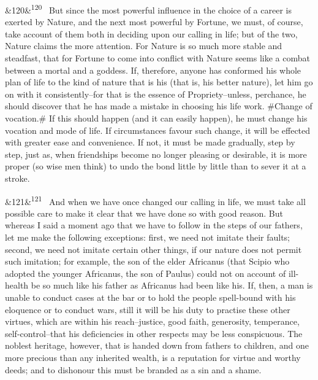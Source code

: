 \documentclass[12pt]{article}
\newcommand{\para}[1][]{\par\noindent\ifx&#1&\else\textsuperscript{\footnotesize #1}~\fi}
\begin{document}
\para[120] But since the most powerful influence in the choice of a career is exerted by Nature, and the next most powerful by Fortune, we must, of course, take account of them both in deciding upon our calling in life; but of the two, Nature claims the more attention. For Nature is so much more stable and steadfast, that for Fortune to come into conflict with Nature seems like a combat between a mortal and a goddess. If, therefore, anyone has conformed his whole plan of life to the kind of nature that is his (that is, his better nature), let him go on with it consistently--for that is the essence of Propriety--unless, perchance, he should discover that he has made a mistake in choosing his life work. \#Change of vocation.\# If this should happen (and it can easily happen), he must change his vocation and mode of life. If circumstances favour such change, it will be effected with greater ease and convenience. If not, it must be made gradually, step by step, just as, when friendships become no longer pleasing or desirable, it is more proper (so wise men think) to undo the bond little by little than to sever it at a stroke.

\para[121] And when we have once changed our calling in life, we must take all possible care to make it clear that we have done so with good reason. But whereas I said a moment ago that we have to follow in the steps of our fathers, let me make the following exceptions: first, we need not imitate their faults; second, we need not imitate certain other things, if our nature does not permit such imitation; for example, the son of the elder Africanus (that Scipio who adopted the younger Africanus, the son of Paulus) could not on account of ill-health be so much like his father as Africanus had been like his. If, then, a man is unable to conduct cases at the bar or to hold the people spell-bound with his eloquence or to conduct wars, still it will be his duty to practise these other virtues, which are within his reach--justice, good faith, generosity, temperance, self-control--that his deficiencies in other respects may be less conspicuous. The noblest heritage, however, that is handed down from fathers to children, and one more precious than any inherited wealth, is a reputation for virtue and worthy deeds; and to dishonour this must be branded as a sin and a shame.
\end{document}
